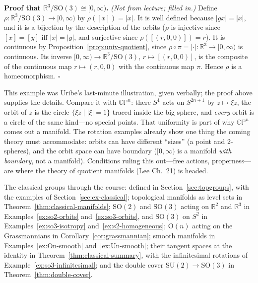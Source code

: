 \documentclass[11pt]{report}
\renewenvironment{proof}[1][Proof]{\noindent\textbf{#1.} }{\hfill$\square$\par\vspace{5pt}}
\newcommand{\Ogp}{\mathrm{O}}
\newcommand{\SO}{\mathrm{SO}}
\begin{document}
\begin{proof}[Proof that $\mathbb{R}^3/\SO(3) \cong [0,\infty)$]
\textit{(Not from lecture; filled in.)} Define $\rho : \mathbb{R}^3/\SO(3) \to [0,\infty)$ by $\rho([x]) = |x|$. It is well defined because $|gx| = |x|$, and it is a bijection by the description of the orbits ($\rho$ is injective since $[x] = [y]$ iff $|x| = |y|$, and surjective since $\rho([(r,0,0)]) = r$). It is continuous by Proposition~\ref{prop:univ-quotient}, since $\rho \circ \pi = |\cdot| : \mathbb{R}^3 \to [0,\infty)$ is continuous. Its inverse $[0,\infty) \to \mathbb{R}^3/\SO(3)$, $r \mapsto [(r,0,0)]$, is the composite of the continuous map $r \mapsto (r,0,0)$ with the continuous map $\pi$. Hence $\rho$ is a homeomorphism.
\end{proof}

\begin{rembox}\label{rem:actions-2}
This example was Uribe's last-minute illustration, given verbally; the proof above supplies the details. Compare it with $\mathbb{CP}^n$: there $S^1$ acts on $S^{2n+1}$ by $z \mapsto \xi z$, the orbit of $z$ is the circle $\{\xi z \mid |\xi| = 1\}$ traced inside the big sphere, and \emph{every} orbit is a circle of the same kind---no special points. That uniformity is part of why $\mathbb{CP}^n$ comes out a manifold. The rotation examples already show one thing the coming theory must accommodate: orbits can have different ``sizes'' (a point and $2$-spheres), and the orbit space can have boundary ($[0,\infty)$ is a manifold \emph{with boundary}, not a manifold). Conditions ruling this out---free actions, properness---are where the theory of quotient manifolds (Lee Ch.\ 21) is headed.
\end{rembox}

The classical groups through the course: defined in Section~\ref{sec:topgroups}, with the examples of Section~\ref{sec:ex-classical}; topological manifolds as level sets in Theorem~\ref{thm:classical-manifolds}; $\SO(2)$ and $\SO(3)$ acting on $\mathbb{R}^2$ and $\mathbb{R}^3$ in Examples~\ref{ex:so2-orbits} and~\ref{ex:so3-orbits}, and $\SO(3)$ on $S^2$ in Examples~\ref{ex:so3-isotropy} and~\ref{ex:s2-homogeneous}; $\Ogp(n)$ acting on the Grassmannians in Corollary~\ref{cor:grassmannian}; smooth manifolds in Examples~\ref{ex:On-smooth} and~\ref{ex:Un-smooth}; their tangent spaces at the identity in Theorem~\ref{thm:classical-summary}, with the infinitesimal rotations of Example~\ref{ex:so3-infinitesimal}; and the double cover $\mathrm{SU}(2) \to \SO(3)$ in Theorem~\ref{thm:double-cover}.
\end{document}

